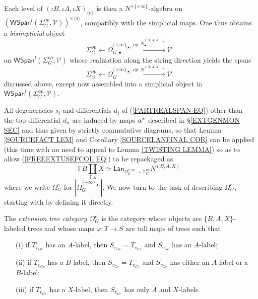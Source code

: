 \documentclass[a4paper,10pt]{article}%
\begin{document}
Each level of $(\iota B,\iota A,\iota X)_{\langle n \rangle}$ is then a $N^{\times \{+\infty\}}$-algebra on 
$\left(
\mathsf{WSpan}^l(\Sigma_G^{op},\mathcal{V})
\right)^{\times \langle n \rangle}$, compatibly with the simplicial maps. One thus obtains a \textit{bisimplicial} object 
\[
	\Sigma_G^{op} \leftarrow 
	\Omega_{G,\bullet}^{\{+\infty\}_{\langle \bullet \rangle},op}
	\xrightarrow{N_{\bullet}^{(B,A,X)_{\langle \bullet \rangle}}}
	\mathcal{V}
\]
on $\mathsf{WSpan}^l(\Sigma_G^{op},\mathcal{V})$
whose realization along the string direction yields the
spans 
\begin{equation}\label{PARTREALSPAN EQ}
	\Sigma_G^{op} \leftarrow 
	\Omega_{G}^{\{+\infty\}_{\langle \bullet \rangle},op}
	\xrightarrow{N^{(B,A,X)_{\langle \bullet \rangle}}}
	\mathcal{V}
\end{equation}
discussed above, except now assembled into a simplicial object in $\mathsf{WSpan}^l(\Sigma_G^{op},\mathcal{V})$.



All degeneracies $s_i$ and differentials $d_i$ of 
(\ref{PARTREALSPAN EQ}) other than the top differential $d_n$ are induced by maps $\alpha^{\**}$ described in \S \ref{EXTGENMON SEC} and thus given by strictly commutative diagrams, so that Lemma \ref{SOURCEFACT LEM} and Corollary \ref{SOURCELANFINAL COR} can be applied (this time with no need to appeal to Lemma \ref{TWISTING LEMMA}) so as to allow 
(\ref{FREEEXTUSEFCOL EQ}) to be repackaged as 
\begin{equation}\label{FREEEXTUSEFCOLNEW EQ}
	\mathbb{F} B \coprod_{\mathbb{F} A} X
\simeq
	\mathsf{Lan}_{\Omega_G^{e,op} \to \Sigma_G^{op}} 
	N^{(B,A,X)}
\end{equation}
where we write $\Omega_G^e$ for 
$|\Omega_{G}^{\{+\infty\}_{\langle \bullet \rangle}}|$.
We now turn to the task of describing $\Omega_G^e$, starting with by defining it directly.

\begin{definition}\label{EXTTREECAT DEF}
	The \textit{extension tree category $\Omega_G^e$} is the category whose objects are $\{B,A,X\}$-labeled trees and whose maps $\varphi \colon T \to S$ are tall maps of trees such that
	\begin{itemize}
		\item[(i)] if $T_{v_{Ge}}$ has an $A$-label, then 
		$S_{v_{Ge}}=T_{v_{Ge}}$ and $S_{v_{Ge}}$ has an $A$-label;
		\item[(ii)] if $T_{v_{Ge}}$ has a $B$-label, then 
		$S_{v_{Ge}}=T_{v_{Ge}}$ and $S_{v_{Ge}}$ has either an $A$-label or a $B$-label;
		\item[(iii)] if $T_{v_{Ge}}$ has a $X$-label, then 
		$S_{v_{Ge}}$ has only $A$ and $X$-labels.
	\end{itemize}
\end{definition}
\end{document}
